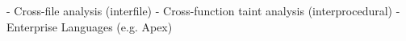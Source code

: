 \documentclass[preview]{standalone}
\begin{document}
\begin{center}
- Cross-file analysis (interfile)
                   - Cross-function taint analysis (interprocedural)
                   - Enterprise Languages (e.g. Apex)
\end{center}
\end{document}
